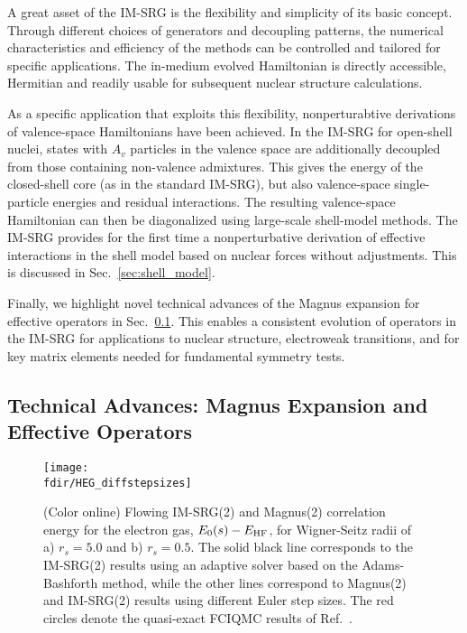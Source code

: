 A great asset of the IM-SRG is the flexibility and simplicity of its
basic concept. Through different choices of generators and decoupling
patterns, the numerical characteristics and efficiency of the methods
can be controlled and tailored for specific applications. The
in-medium evolved Hamiltonian is directly accessible, Hermitian and readily
usable for subsequent nuclear structure calculations.

As a specific application that exploits this flexibility,
nonperturabtive derivations of valence-space Hamiltonians have been
achieved. In the IM-SRG for open-shell nuclei, states with $A_v$
particles in the valence space are additionally decoupled from those
containing non-valence admixtures. This gives the energy of the
closed-shell core (as in the standard IM-SRG), but also valence-space
single-particle energies and residual interactions. The resulting
valence-space Hamiltonian can then be diagonalized using large-scale
shell-model methods. The IM-SRG provides for the first time a
nonperturbative derivation of effective interactions in the shell
model based on nuclear forces without adjustments. This is discussed
in Sec.~\ref{sec:shell_model}.

Finally, we highlight novel technical advances of the Magnus expansion
for effective operators in Sec.~\ref{sec:magnus}. This enables a
consistent evolution of operators in the IM-SRG for applications to
nuclear structure, electroweak transitions, and for key matrix elements
needed for fundamental symmetry tests.

\subsection{Technical Advances: Magnus Expansion and Effective Operators}
\label{sec:magnus}

\begin{figure}[t]
\begin{center}
\texttt{[image: \\fdir/HEG\_diffstepsizes]}
\caption{\label{fig:timestep_HEG}
(Color online) Flowing IM-SRG(2) and Magnus(2) correlation energy for 
the electron gas, $E_0(s)-E_{\rm HF}$, for Wigner-Seitz radii of a)
$r_s=5.0$ and b) $r_s=0.5$. The solid black line corresponds to the
IM-SRG(2) results using an adaptive solver based on the
Adams-Bashforth method, while the other lines correspond to Magnus(2)
and IM-SRG(2) results using different Euler step sizes. The red
circles denote the quasi-exact FCIQMC results of
Ref.~\cite{Shepherd:2012hl}.}
\end{center}
\end{figure}

